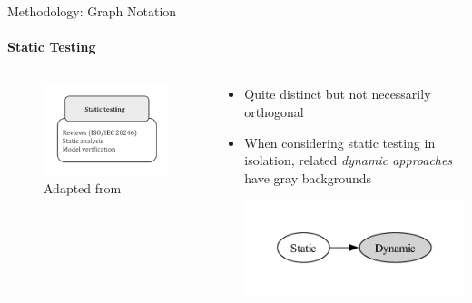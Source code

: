 \documentclass{beamer}
\begin{document}
\begin{frame}{Methodology: Graph Notation}
    \framesubtitle{Static Testing}
    \begin{columns}[c]
        \begin{column}{.4\textwidth}
            \begin{figure}
                \centering
                \includegraphics[width=\linewidth]{assets/images/test approach static testing}
                \caption{\tiny Adapted from \citep[Fig.~2]{IEEE2022}}
            \end{figure}
        \end{column}
        \begin{column}{.6\textwidth}
            \begin{itemize}
                \item \pause Quite distinct but not necessarily orthogonal
                \item \pause When considering static testing in isolation,
                      related \emph{dynamic approaches} have gray backgrounds

                      \vspace{-0.5cm}
                      \includegraphics[width=\linewidth]{assets/graphs/manual/catRels9.pdf}
            \end{itemize}
        \end{column}
    \end{columns}
\end{frame}
\end{document}

